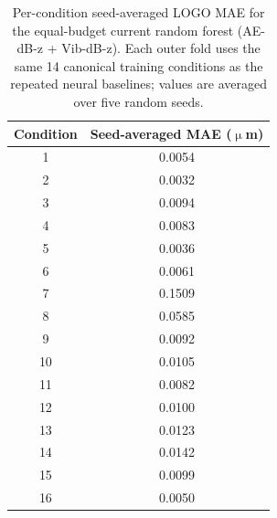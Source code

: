 \begin{table}[htbp]
\centering
\caption{Per-condition seed-averaged LOGO MAE for the equal-budget current random forest (AE-dB-z + Vib-dB-z). Each outer fold uses the same 14 canonical training conditions as the repeated neural baselines; values are averaged over five random seeds.}
\label{tab:supp-seed-repeat-rf}
\begin{tabular}{@{}cc@{}}
\toprule
Condition & Seed-averaged MAE ($\upmu$m) \\
\midrule
1 & 0.0054 \\
2 & 0.0032 \\
3 & 0.0094 \\
4 & 0.0083 \\
5 & 0.0036 \\
6 & 0.0061 \\
7 & 0.1509 \\
8 & 0.0585 \\
9 & 0.0092 \\
10 & 0.0105 \\
11 & 0.0082 \\
12 & 0.0100 \\
13 & 0.0123 \\
14 & 0.0142 \\
15 & 0.0099 \\
16 & 0.0050 \\
\bottomrule
\end{tabular}
\end{table}
